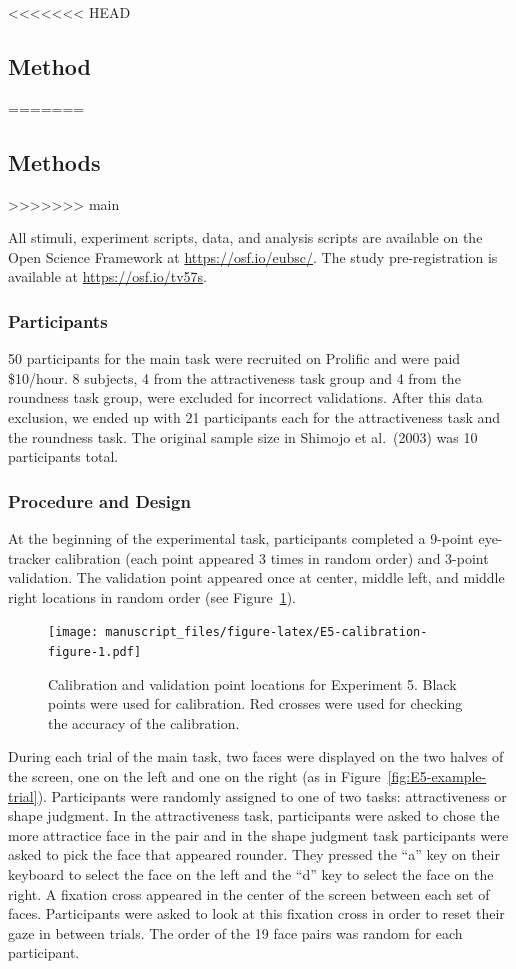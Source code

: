 \documentclass[
  man,floatsintext]{apa6}
\begin{document}
<<<<<<< HEAD
\subsection{Method}\label{method-4}
=======
\subsection{Methods}\label{methods-4}
>>>>>>> main

All stimuli, experiment scripts, data, and analysis scripts are
available on the Open Science Framework at \url{https://osf.io/eubsc/}.
The study pre-registration is available at
\url{https://osf.io/tv57s}.

\subsubsection{Participants}\label{participants-5}

50 participants for the main task were recruited on Prolific and were
paid \$10/hour. 8 subjects, 4 from the attractiveness task group and 4 from
the roundness task group, were excluded for incorrect validations.
After this
data exclusion, we ended up with 21 participants each for the
attractiveness task and the roundness task. The original sample size in
Shimojo et al.~(2003) was 10 participants total.

\subsubsection{Procedure and Design}\label{procedure-and-design}

At the beginning of the experimental task, participants completed a
9-point eye-tracker calibration (each point appeared 3 times in random
order) and 3-point validation. The validation point appeared once at
center, middle left, and middle right locations in random order (see Figure~\ref{fig:E5-calibration-figure}).

\begin{figure}
\centering
\texttt{[image: manuscript\_files/figure-latex/E5-calibration-figure-1.pdf]}
\caption{\label{fig:E5-calibration-figure}Calibration and validation point locations for Experiment 5. Black points were used for calibration. Red crosses were used for checking the accuracy of the calibration.}
\end{figure}

During each trial of the main task, two faces were displayed on the two
halves of the screen, one on the left and one on the right (as in Figure~\ref{fig:E5-example-trial}). Participants were randomly assigned to one of two tasks:
attractiveness or shape judgment. In the attractiveness task,
participants were asked to chose the more attractice face in the pair
and in the shape judgment task participants were asked to pick the face
that appeared rounder. They pressed the ``a'' key on their keyboard to
select the face on the left and the ``d'' key to select the face on the
right. A fixation cross appeared in the center of the screen between
each set of faces. Participants were asked to look at this fixation
cross in order to reset their gaze in between trials. The order of
the 19 face pairs was random for each participant.
\end{document}
